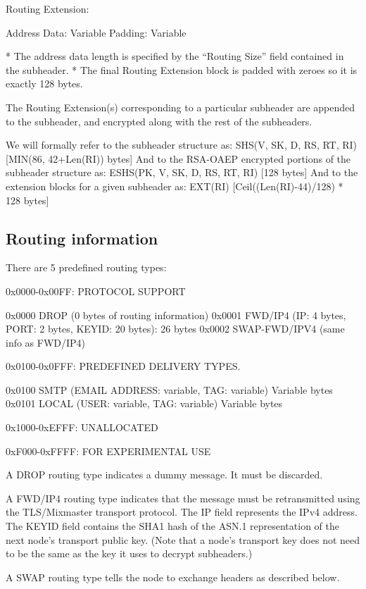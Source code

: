   Routing Extension:

    Address Data:     Variable
    Padding:          Variable

* The address data length is specified by the ``Routing Size'' field
  contained in the subheader.
* The final Routing Extension block is padded with zeroes so it is
  exactly 128 bytes.

The Routing Extension(s) corresponding to a particular subheader are
appended to the subheader, and encrypted along with the rest of the
subheaders.

We will formally refer to the subheader structure as:
SHS(V, SK, D, RS, RT, RI)     [MIN(86, 42+Len(RI)) bytes] 
And to the RSA-OAEP encrypted portions of the subheader structure as:
ESHS(PK, V, SK, D, RS, RT, RI)   [128 bytes]
And to the extension blocks for a given subheader as:
EXT(RI)                       [Ceil((Len(RI)-44)/128) * 128 bytes]

\subsection{Routing information}

There are 5 predefined routing types:

0x0000-0x00FF: PROTOCOL SUPPORT

0x0000 DROP    (0 bytes of routing information)
0x0001 FWD/IP4 (IP: 4 bytes, PORT: 2 bytes, KEYID: 20 bytes): 26 bytes
0x0002 SWAP-FWD/IPV4 (same info as FWD/IP4)

0x0100-0x0FFF: PREDEFINED DELIVERY TYPES.

0x0100 SMTP   (EMAIL ADDRESS: variable, TAG: variable) Variable bytes
0x0101 LOCAL  (USER: variable, TAG: variable) Variable bytes

0x1000-0xEFFF: UNALLOCATED

0xF000-0xFFFF: FOR EXPERIMENTAL USE

A DROP routing type indicates a dummy message. It must be discarded.

A FWD/IP4 routing type indicates that the message must be
retransmitted using the TLS/Mixmaster transport protocol. The IP field
represents the IPv4 address.  The KEYID field contains the SHA1 hash
of the ASN.1 representation of the next node's transport public key.
(Note that a node's transport key does not need to be the same as the
key it uses to decrypt subheaders.)

A SWAP routing type tells the node to exchange headers as described below.

